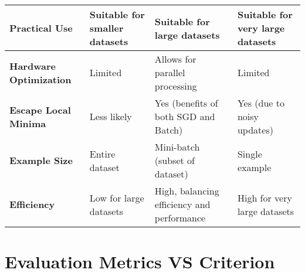 \begin{alternateColorTable}
\begin{longtable}{|p{2.5cm}|p{4cm}|p{3.5cm}|p{3.5cm}|}
    \textbf{Practical Use} & Suitable for smaller datasets & Suitable for large datasets & Suitable for very large datasets \\
    \hline
    
    \textbf{Hardware Optimization} & Limited & Allows for parallel processing & Limited \\
    \hline
    
    \textbf{Escape Local Minima} & Less likely & Yes (benefits of both SGD and Batch) & Yes (due to noisy updates) \\
    \hline
    
    \textbf{Example Size} & Entire dataset & Mini-batch (subset of dataset) & Single example \\
    \hline
    
    \textbf{Efficiency} & Low for large datasets & High, balancing efficiency and performance & High for very large datasets \\
    \hline

\end{longtable}
\end{alternateColorTable}


\section{Evaluation Metrics VS Criterion}\label{Evaluation Metrics VS Criterion}

